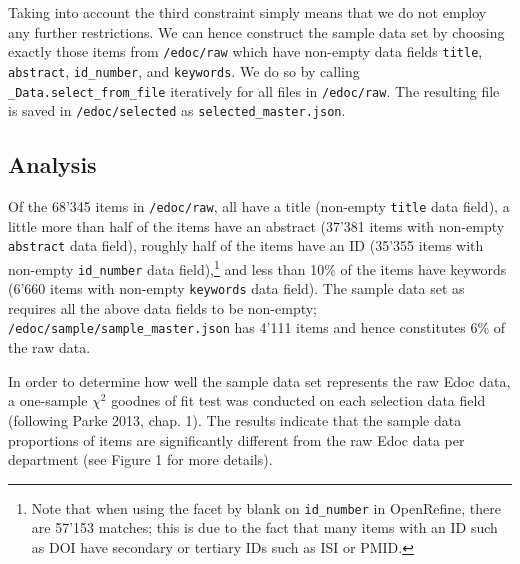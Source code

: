 Taking into account the third constraint simply means that we do not
employ any further restrictions. We can hence construct the sample data
set by choosing exactly those items from \texttt{/edoc/raw} which have
non-empty data fields \texttt{title}, \texttt{abstract},
\texttt{id\_number}, and \texttt{keywords}. We do so by calling
\texttt{\_Data.select\_from\_file} iteratively for all files in
\texttt{/edoc/raw}. The resulting file is saved in
\texttt{/edoc/selected} as \texttt{selected\_master.json}.

\hypertarget{analysis}{%
\subsection{Analysis}\label{analysis}}

Of the 68'345 items in \texttt{/edoc/raw}, all have a title (non-empty
\texttt{title} data field), a little more than half of the items have an
abstract (37'381 items with non-empty \texttt{abstract} data field),
roughly half of the items have an ID (35'355 items with non-empty
\texttt{id\_number} data field),\footnote{Note that when using the facet
  by blank on \texttt{id\_number} in OpenRefine, there are 57'153
  matches; this is due to the fact that many items with an ID such as
  DOI have secondary or tertiary IDs such as ISI or PMID.} and less than
10\% of the items have keywords (6'660 items with non-empty
\texttt{keywords} data field). The sample data set as requires all the
above data fields to be non-empty;
\texttt{/edoc/sample/sample\_master.json} has 4'111 items and hence
constitutes 6\% of the raw data.

In order to determine how well the sample data set represents the raw
Edoc data, a one-sample \(\chi^2\) goodnes of fit test was conducted on
each selection data field (following Parke 2013, chap. 1). The results
indicate that the sample data proportions of items are significantly
different from the raw Edoc data per department (see Figure 1 for more
details).

